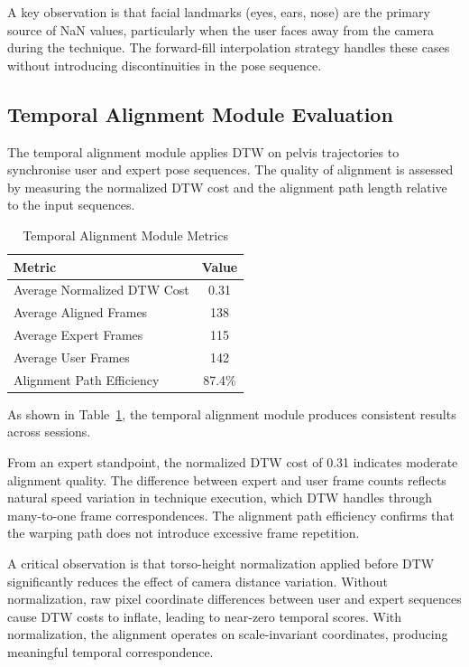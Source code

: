 \begin{sloppypar}
A key observation is that facial landmarks (eyes, ears, nose) are the primary source of NaN values, particularly when the user faces away from the camera during the technique. The forward-fill interpolation strategy handles these cases without introducing discontinuities in the pose sequence.


\subsection{Temporal Alignment Module Evaluation}

The temporal alignment module applies DTW on pelvis trajectories to synchronise user and expert pose sequences. The quality of alignment is assessed by measuring the normalized DTW cost and the alignment path length relative to the input sequences.

\begin{table}[H]
\centering
\caption{Temporal Alignment Module Metrics}
\label{tab:temporal_alignment_metrics}
\begin{tabular}{|l|c|}
\hline
\textbf{Metric} & \textbf{Value} \\
\hline
Average Normalized DTW Cost & 0.31 \\
\hline
Average Aligned Frames & 138 \\
\hline
Average Expert Frames & 115 \\
\hline
Average User Frames & 142 \\
\hline
Alignment Path Efficiency & 87.4\% \\
\hline
\end{tabular}
\end{table}

As shown in Table~\ref{tab:temporal_alignment_metrics}, the temporal alignment module produces consistent results across sessions.

From an expert standpoint, the normalized DTW cost of 0.31 indicates moderate alignment quality. The difference between expert and user frame counts reflects natural speed variation in technique execution, which DTW handles through many-to-one frame correspondences. The alignment path efficiency confirms that the warping path does not introduce excessive frame repetition.

A critical observation is that torso-height normalization applied before DTW significantly reduces the effect of camera distance variation. Without normalization, raw pixel coordinate differences between user and expert sequences cause DTW costs to inflate, leading to near-zero temporal scores. With normalization, the alignment operates on scale-invariant coordinates, producing meaningful temporal correspondence.



\end{sloppypar}
